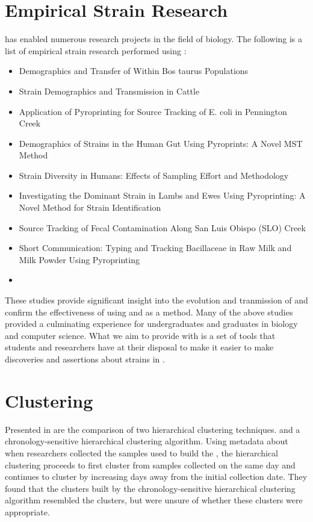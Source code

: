\section{Empirical Strain Research}
\cplop{} has enabled numerous research projects in the field of biology.
The following is a list of empirical strain research performed using \cplop{}:
\begin{itemize}
    \item Demographics and Transfer of \ecoli{} Within Bos taurus Populations \cite{dillard2015demographics}
    \item \ecoli{} Strain Demographics and Transmission in Cattle \cite{dillard2013coli}
    \item Application of Pyroprinting for Source Tracking of E. coli in Pennington Creek \cite{moritz2015application}
    \item Demographics of \ecoli{} Strains in the Human Gut Using Pyroprints:  A Novel MST Method \cite{neal2012demographics}
    \item \ecolilong{} Strain Diversity in Humans: Effects of Sampling Effort and Methodology \cite{neal2013escherichia}
    \item Investigating the Dominant \ecolilong{} Strain in Lambs and Ewes Using Pyroprinting:  A Novel Method for Strain Identification \cite{nguyeninvestigating}
    \item Source Tracking of Fecal Contamination Along San Luis Obispo (SLO) Creek \cite{shapiro2015source}
    \item Short Communication:  Typing and Tracking Bacillaceae in Raw Milk and Milk Powder Using Pyroprinting \cite{vanderkelen2016short}
    \item  \cite{adams2016using}
\end{itemize}

These studies provide significant insight into the evolution and tranmission of \ecoli{} and confirm the effectiveness of using \pyros{} and \cplop{} as a \mst{} method.
Many of the above studies provided a culminating experience for undergraduates and graduates in biology and computer science.
What we aim to provide with \krap{} is a set of tools that students and researchers have at their disposal to make it easier to make discoveries and assertions about strains in \cplop{}.

\section{Clustering}
Presented in \cite{DBLP:conf/bibm/MontanaDNBK11, montana2012investigating} are the comparison of two hierarchical clustering techniques. \primerfive{} \cite{clarke1993non} and a chronology-sensitive hierarchical clustering algorithm.
Using metadata about when researchers collected the samples used to build the \isols{}, the hierarchical clustering proceeds to first cluster \isols{} from samples collected on the same day and continues to cluster by increasing days away from the initial collection date.
They found that the clusters built by the chronology-sensitive hierarchical clustering algorithm resembled the \primerfive{} clusters, but were unsure of whether these clusters were appropriate.

